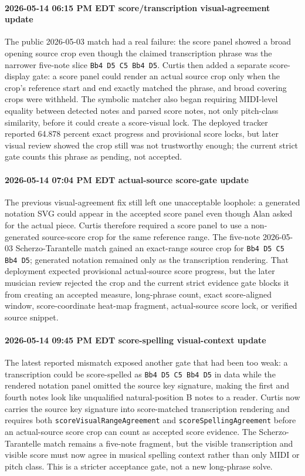\paragraph{2026-05-14 06:15 PM EDT score/transcription visual-agreement update} The public 2026-05-03 match had a real failure: the score panel showed a broad opening source crop even though the claimed transcription phrase was the narrower five-note slice \texttt{Bb4 D5 C5 Bb4 D5}. Curtis then added a separate score-display gate: a score panel could render an actual source crop only when the crop's reference start and end exactly matched the phrase, and broad covering crops were withheld. The symbolic matcher also began requiring MIDI-level equality between detected notes and parsed score notes, not only pitch-class similarity, before it could create a score-visual lock. The deployed tracker reported 64.878 percent exact progress and provisional score locks, but later visual review showed the crop still was not trustworthy enough; the current strict gate counts this phrase as pending, not accepted.

\paragraph{2026-05-14 07:04 PM EDT actual-source score-gate update} The previous visual-agreement fix still left one unacceptable loophole: a generated notation SVG could appear in the accepted score panel even though Alan asked for the actual piece. Curtis therefore required a score panel to use a non-generated source-score crop for the same reference range. The five-note 2026-05-03 Scherzo-Tarantelle match gained an exact-range source crop for \texttt{Bb4 D5 C5 Bb4 D5}; generated notation remained only as the transcription rendering. That deployment expected provisional actual-source score progress, but the later musician review rejected the crop and the current strict evidence gate blocks it from creating an accepted measure, long-phrase count, exact score-aligned window, score-coordinate heat-map fragment, actual-source score lock, or verified source snippet.

\paragraph{2026-05-14 09:45 PM EDT score-spelling visual-context update} The latest reported mismatch exposed another gate that had been too weak: a transcription could be score-spelled as \texttt{Bb4 D5 C5 Bb4 D5} in data while the rendered notation panel omitted the source key signature, making the first and fourth notes look like unqualified natural-position B notes to a reader. Curtis now carries the source key signature into score-matched transcription rendering and requires both \texttt{scoreVisualRangeAgreement} and \texttt{scoreSpellingAgreement} before an actual-source score crop can count as accepted score evidence. The Scherzo-Tarantelle match remains a five-note fragment, but the visible transcription and visible score must now agree in musical spelling context rather than only MIDI or pitch class. This is a stricter acceptance gate, not a new long-phrase solve.

